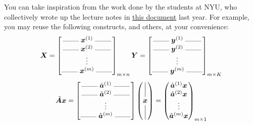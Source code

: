 You can take inspiration from the work done by the students at NYU, who collectively wrote up the lecture notes in \href{https://www.overleaf.com/read/pchjywcxjkxn
}{this document} last year.
For example, you may reuse the following constructs, and others, at your convenience:
\[
\matr{X} = \begin{bmatrix}
    \rule[0.5mm]{0.8cm}{0.1mm} \; \vect{x}^{(1)} \; \rule[0.5mm]{0.8cm}{0.1mm} \\
    \rule[0.5mm]{0.8cm}{0.1mm} \; \vect{x}^{(2)} \; \rule[0.5mm]{0.8cm}{0.1mm} \\
    \vdots \\
    \rule[0.5mm]{0.8cm}{0.1mm} \; \vect{x}^{(m)} \; \rule[0.5mm]{0.8cm}{0.1mm} \\
\end{bmatrix}_{m \times n}
\matr{Y} = \begin{bmatrix}
    \rule[0.5mm]{0.8cm}{0.1mm} \; \vect{y}^{(1)} \; \rule[0.5mm]{0.8cm}{0.1mm} \\
    \rule[0.5mm]{0.8cm}{0.1mm} \; \vect{y}^{(2)} \; \rule[0.5mm]{0.8cm}{0.1mm} \\
    \vdots \\
    \rule[0.5mm]{0.8cm}{0.1mm} \; \vect{y}^{(m)} \; \rule[0.5mm]{0.8cm}{0.1mm} \\
\end{bmatrix}_{m \times K}
\]
\[
\hat{\matr{A}}\vect{x} =
\begin{bmatrix}
    \rule[0.5mm]{0.8cm}{0.1mm} \; \hat{\vect{a}}^{(1)} \; \rule[0.5mm]{0.8cm}{0.1mm} \\
    \rule[0.5mm]{0.8cm}{0.1mm} \; \hat{\vect{a}}^{(2)} \; \rule[0.5mm]{0.8cm}{0.1mm} \\
    \vdots \\
    \rule[0.5mm]{0.8cm}{0.1mm} \; \hat{\vect{a}}^{(m)} \; \rule[0.5mm]{0.8cm}{0.1mm} \\
\end{bmatrix}
\begin{pmatrix}
    \vrule height 0.6cm \\ \vect{x} \\ \vrule height 0.6cm
\end{pmatrix} =
\begin{pmatrix}
    \hat{\vect{a}}^{(1)} \vect{x} \\ \hat{\vect{a}}^{(2)} \vect{x} \\ \vdots \\ \hat{\vect{a}}^{(m)} \vect{x}
\end{pmatrix}_{m \times 1}
\]
